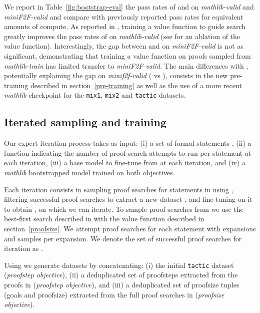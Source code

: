\documentclass[nohyperref]{article}
\theoremstyle{plain}
\theoremstyle{definition}
\theoremstyle{remark}
\begin{document}
We report in Table~\ref{fig:bootstrap-eval} the pass rates of  and  on \textit{mathlib-valid} and \textit{miniF2F-valid} and compare with previously reported pass rates for equivalent amounts of compute. As reported in \citet{polu2020generative}, training a value function to guide search greatly improves the pass rates of  on \textit{mathlib-valid} (see \citet{polu2020generative} for an ablation of the value function). Interestingly, the gap between  and  on \textit{miniF2F-valid} is not as significant, demonstrating that training a value function on proofs sampled from \textit{mathlib-train} has limited transfer to \textit{miniF2F-valid}. The main differences with \citet{zheng2021minif2f}, potentially explaining the gap on \textit{minif2f-valid} ( vs ), consists in the new pre-training described in section~\ref{pre-training} as well as the use of a more recent \textit{mathlib} checkpoint for the \texttt{mix1}, \texttt{mix2} and \texttt{tactic} datasets.



\subsection{Iterated sampling and training}

Our expert iteration process takes as input: (i) a set of formal statements , (ii) a function  indicating the number of proof search attempts to run per statement at each iteration, (iii) a base model  to fine-tune from at each iteration, and (iv) a \textit{mathlib} bootstrapped model  trained on both objectives.

Each iteration  consists in sampling proof searches for statements in  using , filtering successful proof searches  to extract a new dataset , and fine-tuning  on it to obtain , on which we can iterate. To sample proof searches from  we use the best-first search described in \citet{polu2020generative} with the value function described in section~\ref{proofsize}. We attempt  proof searches for each statement  with  expansions and  samples per expansion. We denote the set of successful proof searches for iteration  as . 

Using  we generate datasets  by concatenating: (i) the initial \texttt{tactic} dataset (\textit{proofstep objective}), (ii) a deduplicated set of proofsteps extracted from the proofs in  (\textit{proofstep objective}), and (iii) a deduplicated set of proofsize tuples (goals and proofsize) extracted from the full proof searches in  (\textit{proofsize objective}).
\end{document}
